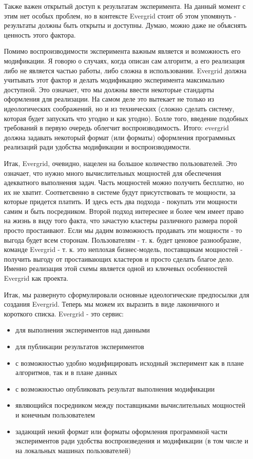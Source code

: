 Также важен открытый доступ к результатам эксперимента. На данный момент с этим нет особых проблем, но в контексте Evergrid стоит об этом упомянуть - результаты должны быть открыты и доступны. Думаю, можно даже не объяснять ценность этого фактора.

Помимо воспроизводимости эксперимента важным является и возможность его модификации. Я говорю о случаях, когда описан сам алгоритм, а его реализация либо не является частью работы, либо сложна в использовании. Evergrid должна учитывать этот фактор и делать модификацию эксперимента максимально доступной. Это означает, что мы должны ввести некоторые стандарты оформления для реализации. На самом деле это вытекает не только из идеологических соображений, но и из технических (сложно сделать систему, которая будет запускать что угодно и как угодно). Болле того, введение подобных требований в первую очередь облегчит воспроизводимость. Итого: evergrid должна задавать некоторый формат (или форматы) оформления программных реализаций ради удобства модификации и воспроизводимости.


Итак, Evergrid, очевидно, нацелен на большое количество пользователей. Это означает, что нужно много вычислительных мощностей для обеспечения адекватного выполнения задач. Часть мощностей можно получить бесплатно, но их не хватит. Соответсвенно в системе будут присутствовать те мощности, за которые придется платить. И здесь есть два подхода - покупать эти мощности самим и быть посредником. Второй подход интереснее и более чем имеет право на жизнь в виду того факта, что зачастую кластеры различного размера порой просто простаивают. Если мы дадим возможность продавать эти мощности - то выгода будет всем сторонам. Пользователям - т. к. будет ценовое разнообразие, команде Evergrid - т. к. это неплохая бизнес-модель, поставщикам мощностей - получить выгоду от простаивающих кластеров и просто сделать благое дело. Именно реализация этой схемы является одной из ключевых особенностей Evergrid как проекта.

Итак, мы развернуто сформулировали основные идеологические предпосылки для создания Evergrid. Теперь мы можем их выразить в виде лаконичного и короткого списка. Evergrid - это сервис:

\begin{itemize}
	\item для выполнения экспериментов над данными
	\item для публикации результатов экспериментов
	\item с возможностью удобно модифицировать исходный эксперимент как в плане алгоритмов, так и в плане данных
	\item с возможностью опубликовать результат выполнения модификации
	\item являющийся посредником между поставщиками вычислительных мощностей и конечным пользователем
	\item задающий некий формат или форматы оформления программной части экспериментов ради удобства воспроизведения и модификации (в том числе и на локальных машинах пользователей)
\end{itemize}

